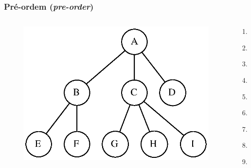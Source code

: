 \documentclass[aspectratio=169]{beamer}
\begin{document}
\begin{frame}\frametitle{Pré-ordem (\emph{pre-order})}
\begin{columns}[T]
\begin{column}{0.7\linewidth}
\begin{figure}[h]
	\centering
	\includegraphics[height=0.5\paperheight]{imagens/arvore_d.eps}
\end{figure}
\end{column}
\begin{column}{0.3\linewidth}
\pause
\begin{enumerate}
	\item A
	\item B
	\item E
	\item F
	\item C
	\item G
	\item H
	\item I
	\item D
\end{enumerate}
\end{column}
\end{columns}
\end{frame}
\end{document}
